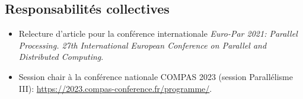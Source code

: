 \documentclass[12pt]{article}
\newcommand{\cvitem}[2]{\item[#1] #2}
\newcounter{cvitems}
\begin{document}
\subsection{Responsabilités collectives}

\begin{itemize}
    \item Relecture d'article pour la conférence internationale
    \emph{\foreignlanguage{english}{Euro-Par 2021: Parallel Processing. 27th International European
    Conference on Parallel and Distributed Computing}}.
    \item Session chair à la conférence nationale COMPAS 2023 (session Parallélisme III):
    \url{https://2023.compas-conference.fr/programme/}.
\end{itemize}











\end{document}
